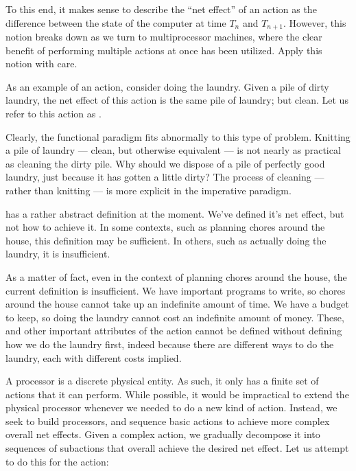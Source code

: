 To this end, it makes sense to describe the ``net effect'' of an action as the
difference between the state of the computer at time $T_n$ and $T_{n+1}$.
However, this notion breaks down as we turn to multiprocessor machines, where
the clear benefit of performing multiple actions at once has been utilized.
Apply this notion with care.


As an example of an action, consider doing the laundry. Given a pile of dirty
laundry, the net effect of this action is the same pile of laundry; but clean.
Let us refer to this action as .

Clearly, the functional paradigm fits abnormally to this type of problem.
Knitting a pile of laundry --- clean, but otherwise equivalent --- is not
nearly as practical as cleaning the dirty pile. Why should we dispose of a pile
of perfectly good laundry, just because it has gotten a little dirty? The
process of cleaning --- rather than knitting --- is more explicit in the
imperative paradigm.

 has a rather abstract definition at the moment. We've
defined it's net effect, but not how to achieve it. In some contexts, such as
planning chores around the house, this definition may be sufficient. In others,
such as actually doing the laundry, it is insufficient.

As a matter of fact, even in the context of planning chores around the house,
the current definition is insufficient. We have important programs to write, so
chores around the house cannot take up an indefinite amount of time. We have a
budget to keep, so doing the laundry cannot cost an indefinite amount of money.
These, and other important attributes of the action cannot be defined without
defining how we do the laundry first, indeed because there are different ways
to do the laundry, each with different costs implied.

A processor is a discrete physical entity. As such, it only has a finite set of
actions that it can perform. While possible, it would be impractical to extend
the physical processor whenever we needed to do a new kind of action. Instead,
we seek to build  processors, and sequence basic actions
to achieve more complex overall net effects. Given a complex action, we
gradually decompose it into sequences of subactions that overall achieve the
desired net effect. Let us attempt to do this for the 
action:

